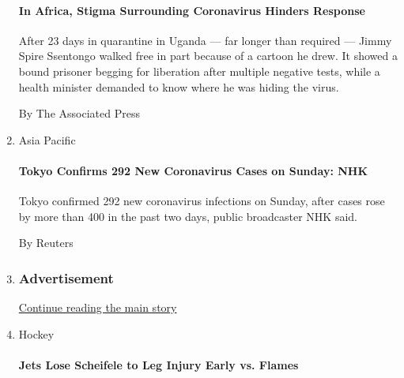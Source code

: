 \begin{enumerate}
  \hypertarget{in-africa-stigma-surrounding-coronavirus-hinders-response}{%
  \paragraph{In Africa, Stigma Surrounding Coronavirus Hinders
  Response}\label{in-africa-stigma-surrounding-coronavirus-hinders-response}}

  After 23 days in quarantine in Uganda --- far longer than required ---
  Jimmy Spire Ssentongo walked free in part because of a cartoon he
  drew. It showed a bound prisoner begging for liberation after multiple
  negative tests, while a health minister demanded to know where he was
  hiding the virus.

  By The Associated Press
\item
  Asia Pacific

  \href{/reuters/2020/08/02/world/asia/02reuters-health-coronavirus-japan.html?searchResultPosition=4}{}

  \hypertarget{tokyo-confirms-292-new-coronavirus-cases-on-sunday-nhk}{%
  \paragraph{Tokyo Confirms 292 New Coronavirus Cases on Sunday:
  NHK}\label{tokyo-confirms-292-new-coronavirus-cases-on-sunday-nhk}}

  Tokyo confirmed 292 new coronavirus infections on Sunday, after cases
  rose by more than 400 in the past two days, public broadcaster NHK
  said.

  By Reuters
\item
  \hypertarget{advertisement}{%
  \subsubsection{Advertisement}\label{advertisement}}

  \protect\hyperlink{after-mid106}{Continue reading the main story}
\item
  Hockey

  \href{/reuters/2020/08/02/sports/hockey/02reuters-icehockey-nhl-wpg.html?searchResultPosition=5}{}

  \hypertarget{jets-lose-scheifele-to-leg-injury-early-vs-flames}{%
  \paragraph{Jets Lose Scheifele to Leg Injury Early vs.
  Flames}\label{jets-lose-scheifele-to-leg-injury-early-vs-flames}}


\end{enumerate}
